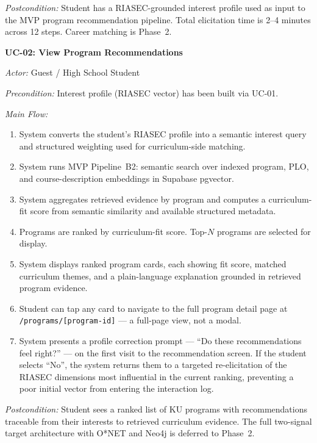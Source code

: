 \noindent\textit{Postcondition:} Student has a RIASEC-grounded interest profile used as input to the MVP program recommendation pipeline. Total elicitation time is 2--4 minutes across 12 steps. Career matching is Phase~2.

\vspace{1ex}
\noindent\textbf{UC-02: View Program Recommendations}

\noindent\textit{Actor:} Guest / High School Student

\noindent\textit{Precondition:} Interest profile (RIASEC vector) has been built via UC-01.

\noindent\textit{Main Flow:}
\begin{enumerate}[leftmargin=80pt]
    \item System converts the student's RIASEC profile into a semantic interest query and structured weighting used for curriculum-side matching.
    \item System runs MVP Pipeline~B2: semantic search over indexed program, PLO, and course-description embeddings in Supabase pgvector.
    \item System aggregates retrieved evidence by program and computes a curriculum-fit score from semantic similarity and available structured metadata.
    \item Programs are ranked by curriculum-fit score. Top-$N$ programs are selected for display.
    \item System displays ranked program cards, each showing fit score, matched curriculum themes, and a plain-language explanation grounded in retrieved program evidence.
    \item Student can tap any card to navigate to the full program detail page at \texttt{/programs/[program-id]} --- a full-page view, not a modal.
    \item System presents a profile correction prompt --- ``Do these recommendations feel right?'' --- on the first visit to the recommendation screen. If the student selects ``No'', the system returns them to a targeted re-elicitation of the RIASEC dimensions most influential in the current ranking, preventing a poor initial vector from entering the interaction log.
\end{enumerate}

\noindent\textit{Postcondition:} Student sees a ranked list of KU programs with recommendations traceable from their interests to retrieved curriculum evidence. The full two-signal target architecture with O*NET and Neo4j is deferred to Phase~2.

